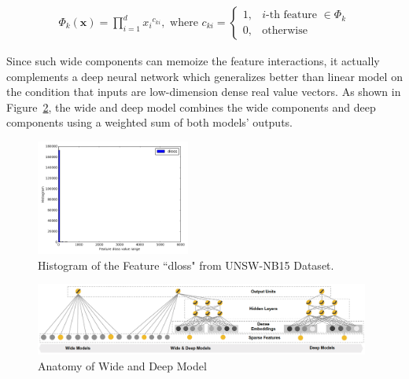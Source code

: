\begin{align}
    \Phi_k (\mathbf{x} ) = \prod_{i=1}^{d} {x_i}^{c_{ki}}, \text{ where }
c_{ki} = 
\begin{cases}
    1, & \text{$i$-th feature $\in \Phi_k$} \\
    0, & \text{otherwise}
\end{cases}
\end{align}

Since such wide components can memoize the feature interactions, it actually complements a deep neural network
which generalizes better than linear model on the condition that inputs are low-dimension dense real value vectors.
As shown in Figure~\ref{Fig:WideDeepModel}, the wide and deep model combines the wide components and deep components
using a weighted sum of both models' outputs.

\begin{figure}[h]
    \centering
    \includegraphics[width=0.45\textwidth]{figures/dloss_hist.png}
    \caption{Histogram of the Feature ``dloss" from UNSW-NB15 Dataset.}
    \label{Fig:DlossHist}
\end{figure}

\begin{figure}[h]
    \centering
    \includegraphics[width=0.98\textwidth]{figures/WideDeepModel.png}
    \caption{Anatomy of Wide and Deep Model}
    \label{Fig:WideDeepModel}
\end{figure}
